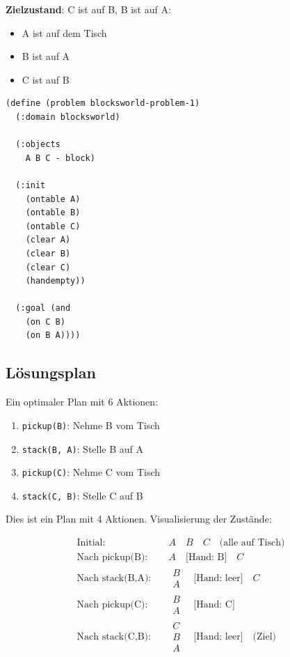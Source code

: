 ﻿\documentclass[a4paper,12pt]{article}
\theoremstyle{definition}
\begin{document}
\textbf{Zielzustand}: C ist auf B, B ist auf A:
\begin{itemize}
	\item[-] A ist auf dem Tisch
	\item[-] B ist auf A
	\item[-] C ist auf B
\end{itemize}

\begin{lstlisting}[language=PDDL, caption=Blocksworld Problem]
(define (problem blocksworld-problem-1)
  (:domain blocksworld)
  
  (:objects
    A B C - block)
  
  (:init
    (ontable A)
    (ontable B)
    (ontable C)
    (clear A)
    (clear B)
    (clear C)
    (handempty))
  
  (:goal (and
    (on C B)
    (on B A))))
\end{lstlisting}

\subsection{Lösungsplan}

Ein optimaler Plan mit 6 Aktionen:

\begin{enumerate}
	\item \texttt{pickup(B)}: Nehme B vom Tisch
	\item \texttt{stack(B, A)}: Stelle B auf A
	\item \texttt{pickup(C)}: Nehme C vom Tisch
	\item \texttt{stack(C, B)}: Stelle C auf B
\end{enumerate}

Dies ist ein Plan mit 4 Aktionen. Visualisierung der Zustände:

\begin{align*}
\text{Initial:} \quad & A \quad B \quad C \quad \text{(alle auf Tisch)} \\
\text{Nach pickup(B):} \quad & A \quad \text{[Hand: B]} \quad C \\
\text{Nach stack(B,A):} \quad & \begin{array}{c} B \\ A \end{array} \quad \text{[Hand: leer]} \quad C \\
\text{Nach pickup(C):} \quad & \begin{array}{c} B \\ A \end{array} \quad \text{[Hand: C]} \\
\text{Nach stack(C,B):} \quad & \begin{array}{c} C \\ B \\ A \end{array} \quad \text{[Hand: leer]} \quad \text{(Ziel)}
\end{align*}
\end{document}
